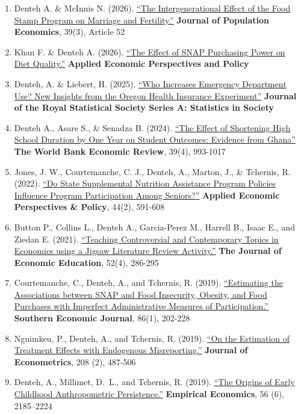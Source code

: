 \documentclass[12pt,letterpaper]{article}
\begin{document}
\begin{enumerate}
\item Denteh A. \& McInnis N. (2026). \href{https://doi.org/10.1007/s00148-026-01198-4}{``The Intergenerational Effect of the Food Stamp Program on Marriage and Fertility.''} \textbf{Journal of Population Economics}, 39(3), Article 52
\item Khan F. \& Denteh A. (2026). \href{https://doi.org/10.1002/aepp.70125}{``The Effect of SNAP Purchasing Power on Diet Quality.''} \textbf{Applied Economic Perspectives and Policy}
\item Denteh, A. \& Liebert, H. (2025). \href{https://doi.org/10.1093/jrsssa/qnaf114}{``Who Increases Emergency Department Use? New Insights from the Oregon Health Insurance Experiment''} \textbf{Journal of the Royal Statistical Society Series A: Statistics in Society}
\item Denteh A., Asare S., \& Senadza B. (2024). \href{https://doi.org/10.1093/wber/lhae046}{``The Effect of Shortening High School Duration by One Year on Student Outcomes: Evidence from Ghana''} \textbf{The World Bank Economic Review}, 39(4), 993-1017
\item Jones, J. W., Courtemanche, C. J., Denteh, A., Marton, J., \& Tchernis, R. (2022). \href{https://doi.org/10.1002/aepp.13231}{``Do State Supplemental Nutrition Assistance Program Policies Influence Program Participation Among Seniors?''} \textbf{Applied Economic Perspectives \& Policy}, 44(2), 591-608
\item Button P., Collins L., Denteh A., Garcia-Perez M., Harrell B., Isaac E., and Ziedan E. (2021). \href{https://doi.org/10.1080/00220485.2021.1963373}{``Teaching Controversial and Contemporary Topics in Economics using a Jigsaw Literature Review Activity.''} \textbf{The Journal of Economic Education}, 52(4), 286-295
\item Courtemanche, C., Denteh, A., and Tchernis, R. (2019).
\href{https://doi.org/10.1002/soej.12364}{``Estimating the Associations between SNAP and Food Insecurity, Obesity, and Food Purchases with Imperfect Administrative Measures of Participation.''} \textbf{Southern Economic Journal}, 86(1), 202-228
\item Nguimkeu, P., Denteh, A., and Tchernis, R. (2019).
  \href{https://doi.org/10.1016/j.jeconom.2018.10.005}{``On the Estimation of Treatment Effects with
 Endogenous Misreporting.''} \textbf{Journal of Econometrics}, 208 (2), 487-506
\item Denteh, A., Millimet, D.~L., and Tchernis, R. (2019).
  \href{https://doi.org/10.1007/s00181-018-1421-z}{``The Origins of Early Childhood Anthropometric Persistence.''} \textbf{Empirical Economics}, 56 (6), 2185–2224
\end{enumerate}
\end{document}
